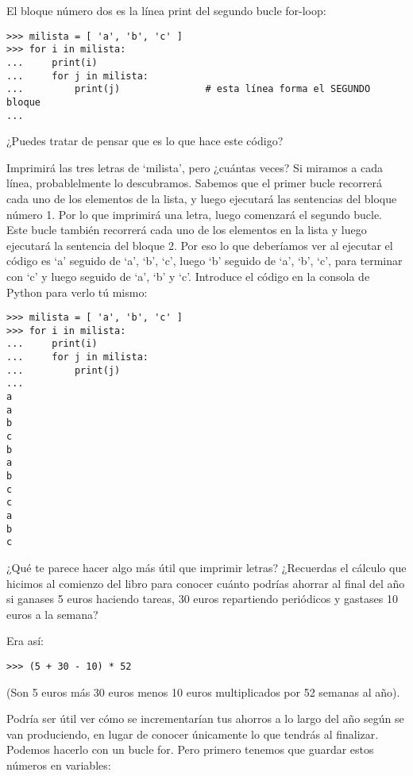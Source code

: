El bloque número dos es la línea print del segundo bucle for-loop:

\begin{listing}
\begin{verbatim}
>>> milista = [ 'a', 'b', 'c' ]
>>> for i in milista:
...     print(i)
...     for j in milista:
...         print(j)               # esta línea forma el SEGUNDO bloque
...
\end{verbatim}
\end{listing}

¿Puedes tratar de pensar que es lo que hace este código?
\par
Imprimirá las tres letras de `milista', pero ¿cuántas veces?  Si miramos a cada línea, probablelmente lo descubramos. Sabemos que el primer bucle recorrerá cada uno de los elementos de la lista, y luego ejecutará las sentencias del bloque número 1. Por lo que imprimirá una letra, luego comenzará el segundo bucle. Este bucle también recorrerá cada uno de los elementos en la lista y luego ejecutará la sentencia del bloque 2.  Por eso lo que deberíamos ver al ejecutar el código es `a' seguido de `a', `b', `c', luego `b' seguido de `a', `b', `c', para terminar con `c' y luego seguido de `a', `b' y `c'.  Introduce el código en la consola de Python para verlo tú mismo:

\begin{listing}
\begin{verbatim}
>>> milista = [ 'a', 'b', 'c' ]
>>> for i in milista:
...     print(i)
...     for j in milista:
...         print(j)
... 
a
a
b
c
b
a
b
c
c
a
b
c
\end{verbatim}
\end{listing}

¿Qué te parece hacer algo más útil que imprimir letras?  ¿Recuerdas el cálculo que hicimos al comienzo del libro para conocer cuánto podrías ahorrar al final del año si ganases 5 euros haciendo tareas, 30 euros repartiendo periódicos y gastases 10 euros a la semana?
\par
\noindent
Era así:

\begin{listing}
\begin{verbatim}
>>> (5 + 30 - 10) * 52
\end{verbatim}
\end{listing}

\noindent
(Son 5 euros más 30 euros menos 10 euros multiplicados por 52 semanas al año).

Podría ser útil ver cómo se incrementarían tus ahorros a lo largo del año según se van produciendo, en lugar de conocer únicamente lo que tendrás al finalizar.  Podemos hacerlo con un bucle for.  Pero primero tenemos que guardar estos números en variables:

